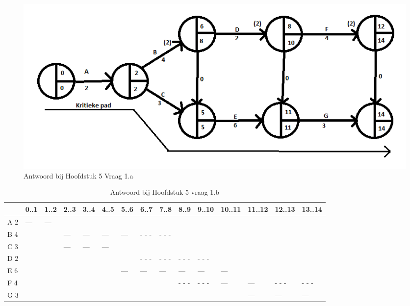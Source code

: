 \documentclass[a4paper,titlepage]{artikel1}
\begin{document}
       \begin{figure}[tbh]
         \caption{Antwoord bij Hoofdstuk 5 Vraag 1.a} \label{r51a}
         \includegraphics[scale=0.75]{H5O1A.png}     
       \end{figure}
   \begin{table}
     \caption{Antwoord bij Hoofdstuk 5 vraag 1.b} \label{r51b}
       \begin{tabular}[htb]{|l|l|l|l|l|l|l|l|l|l|l|l|l|l|l|}
         \hline
             & 0..1 & 1..2 & 2..3 & 3..4 & 4..5 & 5..6 & 6..7 & 7..8 & 8..9 & 9..10 & 10..11 & 11..12 & 12..13 & 13..14 \\
         \hline
         A 2 &  --- &  --- &      &      &      &      &      &      &      &       &        &        &        &\\
         \hline
         B 4 &      &      &  --- & ---  & ---  & ---  & - - -& - - -&      &       &        &        &        &\\
         \hline
         C 3 &      &      &  --- & ---  & ---  &      &      &      &      &       &        &        &        &\\
         \hline
         D 2 &      &      &      &      &      &      & - - -& - - -& - - -& - - - &        &        &        &\\  
         \hline
         E 6 &      &      &      &      &      & ---  & ---  & ---  & ---  & ---   & ---    &        &        &\\
         \hline     
         F 4 &      &      &      &      &      &      &      &      & - - -& - - - & ---    & ---    & - - -  & - - -\\
         \hline
         G 3 &      &      &      &      &      &      &      &      &      &       &        & ---    & ---    & ---\\
         \hline
       \end{tabular}
   \end{table}
   
\end{document}
